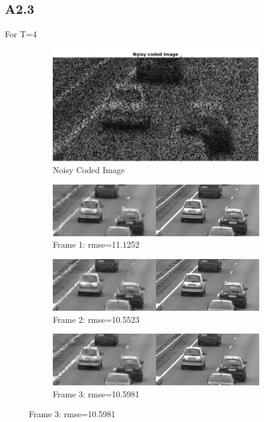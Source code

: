 \documentclass{article}
\begin{document}
\subsection*{A2.3}
For T=4
\begin{figure}[H]
  \centering

  
  \begin{subfigure}[t]{1.0\linewidth}
    \centering
    \includegraphics[scale=0.25]{images/noisy_coded_img_t4}
    \caption{Noisy Coded Image}
  \end{subfigure}
  
  \begin{subfigure}[t]{1.0\linewidth}
    \centering
    \includegraphics[scale=0.5]{images/frame_1_t4}
    \caption{Frame 1: rmse=11.1252}
  \end{subfigure}

  \begin{subfigure}[t]{1.0\linewidth}
    \centering
    \includegraphics[scale=0.5]{images/frame_2_t4}
    \caption{Frame 2: rmse=10.5523}
  \end{subfigure}

  \begin{subfigure}[t]{1.0\linewidth}
    \centering
    \includegraphics[scale=0.5]{images/frame_3_t4}
    \caption{Frame 3: rmse=10.5981}
  \end{subfigure}


\end{figure}
\end{document}
